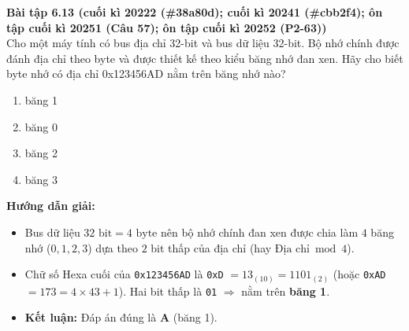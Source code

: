 \textbf{Bài tập 6.13 (cuối kì 20222 (\#38a80d); cuối kì 20241 (\#cbb2f4); ôn tập cuối kì 20251 (Câu 57); ôn tập cuối kì 20252 (P2-63))}\\
Cho một máy tính có bus địa chỉ 32-bit và bus dữ liệu 32-bit. Bộ nhớ chính được đánh địa chỉ theo byte và được thiết kế theo kiểu băng nhớ đan xen. Hãy cho biết byte nhớ có địa chỉ 0x123456AD nằm trên băng nhớ nào?
\begin{enumerate}[label=\Alph*.]
    \item băng 1
    \item băng 0
    \item băng 2
    \item băng 3
\end{enumerate}
\textbf{Hướng dẫn giải:}
\begin{itemize}
    \item Bus dữ liệu $32\text{ bit} = 4\text{ byte}$ nên bộ nhớ chính đan xen được chia làm $4$ băng nhớ ($0, 1, 2, 3$) dựa theo $2$ bit thấp của địa chỉ (hay $\text{Địa chỉ} \bmod 4$).
    \item Chữ số Hexa cuối của \texttt{0x123456AD} là \texttt{0xD} $= 13_{(10)} = 1101_{(2)}$ (hoặc \texttt{0xAD} $= 173 = 4 \times 43 + 1$). Hai bit thấp là \texttt{01} $\Rightarrow$ nằm trên \textbf{băng 1}.
    \item \textbf{Kết luận:} Đáp án đúng là \textbf{A} (băng 1).
\end{itemize}

